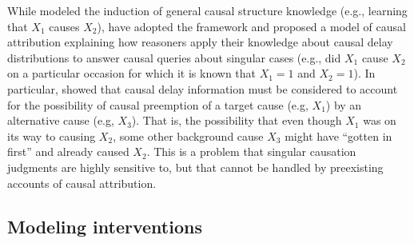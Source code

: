 \documentclass{cambridge7A}%
\begin{document}
While \cite{bramley2018time} modeled the induction of general causal structure knowledge (e.g., learning that $X_1$ causes $X_2$), \cite{stephan2018latency} have adopted the framework and proposed a model of causal attribution explaining how reasoners apply their knowledge about causal delay distributions to answer causal queries about singular cases (e.g., did $X_1$ cause $X_2$ on a particular occasion for which it is known that $X_1 = 1$ and $X_2 = 1$). In particular, \cite{stephan2018latency}  showed that causal delay information must be considered to account for the possibility of causal preemption of a target cause (e.g, $X_1$) by an alternative cause (e.g, $X_3$).  That is, the possibility that even though $X_1$ was on its way to causing $X_2$, some other background cause $X_3$ might have ``gotten in first'' and already caused $X_2$. This is a problem that singular causation judgments are highly sensitive to, but that cannot be handled by preexisting accounts of causal attribution.

\subsection{Modeling interventions}
\end{document}
